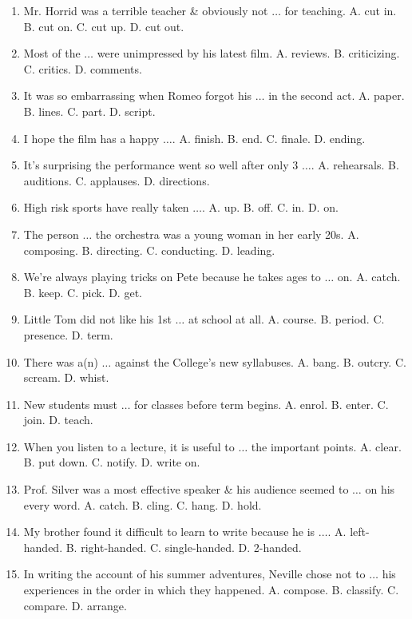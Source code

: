 \documentclass{article}
\numberwithin{equation}{section}
\begin{document}
\begin{enumerate}[leftmargin=8mm]
	\item Mr. Horrid was a terrible teacher \& obviously not $\ldots$ for teaching. {\sf A.} cut in. {\sf B.} cut on. {\sf C.} cut up. {\sf D.} cut out.
	\item Most of the $\ldots$ were unimpressed by his latest film. {\sf A.} reviews. {\sf B.} criticizing. {\sf C.} critics. {\sf D.} comments.
	\item It was so embarrassing when Romeo forgot his $\ldots$ in the second act. {\sf A.} paper. {\sf B.} lines. {\sf C.} part. {\sf D.} script.
	\item I hope the film has a happy $\ldots$. {\sf A.} finish. {\sf B.} end. {\sf C.} finale. {\sf D.} ending.
	\item It's surprising the performance went so well after only 3 $\ldots$. {\sf A.} rehearsals. {\sf B.} auditions. {\sf C.} applauses. {\sf D.} directions.
	\item High risk sports have really taken $\ldots$. {\sf A.} up. {\sf B.} off. {\sf C.} in. {\sf D.} on.
	\item The person $\ldots$ the orchestra was a young woman in her early 20s. {\sf A.} composing. {\sf B.} directing. {\sf C.} conducting. {\sf D.} leading.
	\item We're always playing tricks on Pete because he takes ages to $\ldots$ on. {\sf A.} catch. {\sf B.} keep. {\sf C.} pick. {\sf D.} get.
	\item Little Tom did not like his 1st $\ldots$ at school at all. {\sf A.} course. {\sf B.} period. {\sf C.} presence. {\sf D.} term.
	\item There was a(n) $\ldots$ against the College's new syllabuses. {\sf A.} bang. {\sf B.} outcry. {\sf C.} scream. {\sf D.} whist.
	\item New students must $\ldots$ for classes before term begins. {\sf A.} enrol. {\sf B.} enter. {\sf C.} join. {\sf D.} teach.
	\item When you listen to a lecture, it is useful to $\ldots$ the important points. {\sf A.} clear. {\sf B.} put down. {\sf C.} notify. {\sf D.} write on.
	\item Prof. Silver was a most effective speaker \& his audience seemed to $\ldots$ on his every word. {\sf A.} catch. {\sf B.} cling. {\sf C.} hang. {\sf D.} hold.
	\item My brother found it difficult to learn to write because he is $\ldots$. {\sf A.} left-handed. {\sf B.} right-handed. {\sf C.} single-handed. {\sf D.} 2-handed.
	\item In writing the account of his summer adventures, Neville chose not to $\ldots$ his experiences in the order in which they happened. {\sf A.} compose. {\sf B.} classify. {\sf C.} compare. {\sf D.} arrange.

\end{enumerate}
\end{document}
